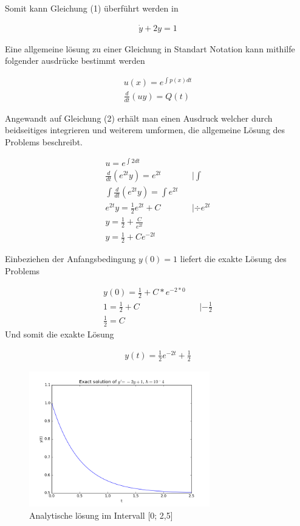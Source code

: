 \documentclass{article}
\begin{document}
			Somit kann Gleichung (1) überführt werden in
			
			\begin{align}
				\dot{y} + 2y = 1
			\end{align}
			
			Eine allgemeine lösung zu einer Gleichung in Standart Notation kann mithilfe folgender ausdrücke bestimmt werden
			
			\begin{align*}
				u(x) = e^{\int p(x) dt} \\
				\frac{d}{dt}(uy) = Q(t)
			\end{align*}
			
			Angewandt auf Gleichung (2) erhält man einen Ausdruck welcher durch beidseitiges integrieren und weiterem umformen, die
			allgemeine Lösung des Problems beschreibt.
			
			\begin{align*}
				u = e^{\int 2 dt}\\
				\frac{d}{dt}(e^{2t}y) = e^{2t} && | \int \\
				\int \frac{d}{dt}(e^{2t}y) = \int e^{2t} \\
				e^{2t}y = \frac{1}{2}e^{2t} + C && | \div e^{2t} \\
				y = \frac{1}{2} + \frac{C}{e^{2t}} \\
				y = \frac{1}{2} + Ce^{-2t}
			\end{align*}
			
			Einbeziehen der Anfangsbedingung $y(0) = 1$ liefert die exakte Lösung des Problems
			
			\begin{align*}
				y(0) = \frac{1}{2} + C*e^{-2*0} \\
				1 = \frac{1}{2} + C && | - \frac{1}{2} \\
				\frac{1}{2} = C
			\end{align*}
			\newpage
			Und somit die exakte Lösung
			
			\begin{align}
				y(t) = \frac{1}{2}e^{-2t} + \frac{1}{2}
			\end{align}
			
			\begin{figure}[H] 
			  \centering
			     \includegraphics[width=0.7\textwidth]{analytic_solution.png}
			  \caption{Analytische lösung im Intervall [0; 2,5]}
			  \label{fig:Bild1}
			\end{figure}
			
\end{document}
